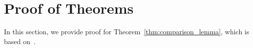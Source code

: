 \documentclass[letterpaper]{article} %
\newcommand{\resolved}[1]{}
\begin{document}
%     





\appendix


\section{Proof of Theorems}
In this section, we provide proof for Theorem~\ref{thm:comparison_lemma}, which is based on~\cite[Theorem 3.1]{ikeda1977comparison}.
\end{document}

